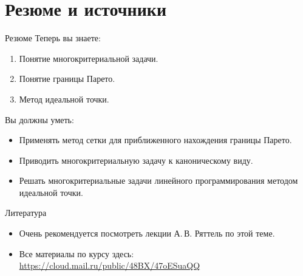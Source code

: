 \documentclass[unicode,11pt,notheorems,xcolor=table]{beamer}
\begin{document}
 \section{Резюме и источники}
\begin{frame}{Резюме}
	Теперь вы знаете:
	\begin{enumerate}
	\item 
		Понятие многокритериальной задачи.
	\item 
		Понятие границы Парето.
    \item 
		Метод идеальной точки.
	\end{enumerate}
	
	Вы должны уметь:
	\begin{itemize}
		\item 
			Применять метод сетки для приближенного нахождения границы Парето.
		\item 
			Приводить многокритериальную задачу к каноническому виду.
		\item 
			Решать многокритериальные задачи линейного программирования методом идеальной точки.
		\end{itemize}
	
\end{frame}

\begin{frame}{Литература}
\begin{itemize}
    \item
    Очень рекомендуется посмотреть лекции А.\,В. Ряттель по этой теме.


\item 
	Все материалы по курсу здесь:
{\color{blue}\url{https://cloud.mail.ru/public/48BX/47oESuaQQ}}
\end{itemize}

\end{frame}
\end{document}
